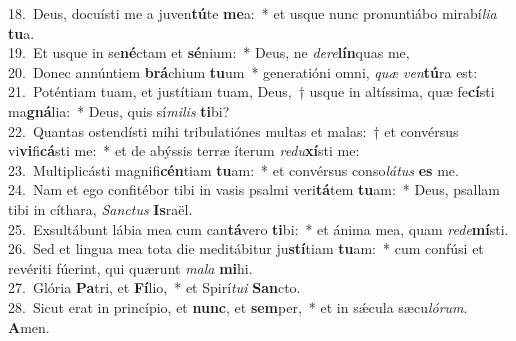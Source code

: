 {18.~}Deus, docuísti me a juven\textbf{tú}te \textbf{me}a:~* et usque nunc pronuntiábo mirabí\textit{li}\textit{a} \textbf{tu}a.\\
{19.~}Et usque in se\textbf{né}ctam et \textbf{sé}nium:~* Deus, ne \textit{de}\textit{re}\textbf{lín}quas me,\\
{20.~}Donec annúntiem \textbf{brá}chium \textbf{tu}um~* generatióni omni, \textit{quæ} \textit{ven}\textbf{tú}ra est:\\
{21.~}Poténtiam tuam, et justítiam tuam, Deus,~† usque in altíssima, quæ fe\textbf{cí}sti ma\textbf{gná}lia:~* Deus, quis sí\textit{mi}\textit{lis} \textbf{ti}bi?\\
{22.~}Quantas ostendísti mihi tribulatiónes multas et malas:~† et convérsus vi\textbf{vi}fi\textbf{cá}sti me:~* et de abýssis terræ íterum \textit{re}\textit{du}\textbf{xí}sti me:\\
{23.~}Multiplicásti magnifi\textbf{cén}tiam \textbf{tu}am:~* et convérsus conso\textit{lá}\textit{tus} \textbf{es} me.\\
{24.~}Nam et ego confitébor tibi in vasis psalmi veri\textbf{tá}tem \textbf{tu}am:~* Deus, psallam tibi in cíthara, \textit{San}\textit{ctus} \textbf{Is}raël.\\
{25.~}Exsultábunt lábia mea cum can\textbf{tá}vero \textbf{ti}bi:~* et ánima mea, quam \textit{re}\textit{de}\textbf{mí}sti.\\
{26.~}Sed et lingua mea tota die meditábitur ju\textbf{stí}tiam \textbf{tu}am:~* cum confúsi et revériti fúerint, qui quærunt \textit{ma}\textit{la} \textbf{mi}hi.\\
{27.~}Glória \textbf{Pa}tri, et \textbf{Fí}lio,~* et Spirí\textit{tu}\textit{i} \textbf{San}cto.\\
{28.~}Sicut erat in princípio, et \textbf{nunc}, et \textbf{sem}per,~* et in sǽcula sæcu\textit{ló}\textit{rum}. \textbf{A}men.\\
